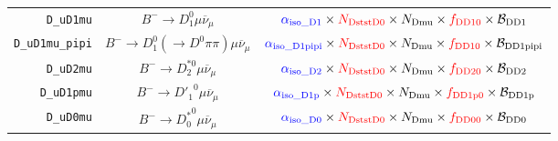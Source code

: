 \begin{landscape}
\begin{table}
\begin{tabular}{r|c|c}
        \texttt{D\_uD1mu} &                    $B^- \rightarrow D_1^0 \mu \overline{\nu}_\mu$                    &                                                                                                   $\textcolor{blue}{\alpha_\text{iso\_D1}} \times \textcolor{red}{N_\text{DststD0}} \times N_\text{Dmu} \times \textcolor{red}{f_\text{DD10}} \times \mathcal{B}_\text{DD1}$                                                                                                   \\
  \texttt{D\_uD1mu\_pipi} &       $B^- \rightarrow D_1^0 (\rightarrow D^0 \pi\pi) \mu \overline{\nu}_\mu$        &                                                                                               $\textcolor{blue}{\alpha_\text{iso\_D1pipi}} \times \textcolor{red}{N_\text{DststD0}} \times N_\text{Dmu} \times \textcolor{red}{f_\text{DD10}} \times \mathcal{B}_\text{DD1pipi}$                                                                                               \\
        \texttt{D\_uD2mu} &                  $B^- \rightarrow D_2^{*0} \mu \overline{\nu}_\mu$                   &                                                                                                   $\textcolor{blue}{\alpha_\text{iso\_D2}} \times \textcolor{red}{N_\text{DststD0}} \times N_\text{Dmu} \times \textcolor{red}{f_\text{DD20}} \times \mathcal{B}_\text{DD2}$                                                                                                   \\
       \texttt{D\_uD1pmu} &                  $B^- \rightarrow {D'_1}^0 \mu \overline{\nu}_\mu$                   &                                                                                                 $\textcolor{blue}{\alpha_\text{iso\_D1p}} \times \textcolor{red}{N_\text{DststD0}} \times N_\text{Dmu} \times \textcolor{red}{f_\text{DD1p0}} \times \mathcal{B}_\text{DD1p}$                                                                                                  \\
        \texttt{D\_uD0mu} &                  $B^- \rightarrow {D^*_0}^0 \mu \overline{\nu}_\mu$                  &                                                                                                   $\textcolor{blue}{\alpha_\text{iso\_D0}} \times \textcolor{red}{N_\text{DststD0}} \times N_\text{Dmu} \times \textcolor{red}{f_\text{DD00}} \times \mathcal{B}_\text{DD0}$                                                                                                   \\

\end{tabular}
\end{table}
\end{landscape}
